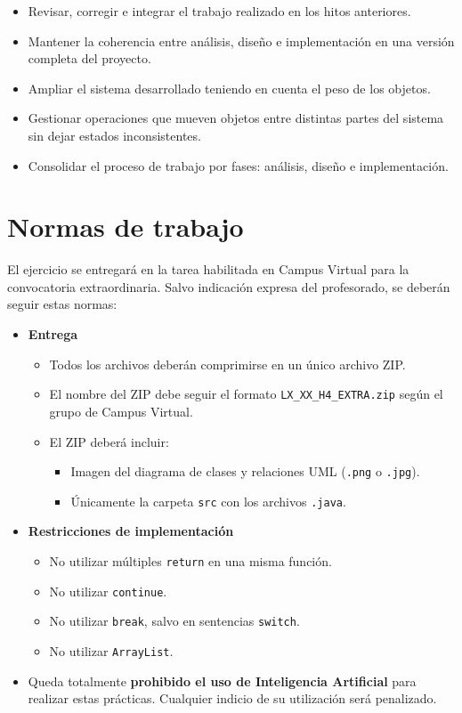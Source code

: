 \documentclass[11pt,a4paper]{article}
\begin{document}
\begin{itemize}
    \item Revisar, corregir e integrar el trabajo realizado en los hitos anteriores.
    \item Mantener la coherencia entre análisis, diseño e implementación en una versión completa del proyecto.
    \item Ampliar el sistema desarrollado teniendo en cuenta el peso de los objetos.
    \item Gestionar operaciones que mueven objetos entre distintas partes del sistema sin dejar estados inconsistentes.
    \item Consolidar el proceso de trabajo por fases: análisis, diseño e implementación.
\end{itemize}

\section{Normas de trabajo}

El ejercicio se entregará en la tarea habilitada en Campus Virtual para la convocatoria extraordinaria. Salvo indicación expresa del profesorado, se deberán seguir estas normas:

\begin{itemize}
    \item \textbf{Entrega}
    \begin{itemize}
        \item Todos los archivos deberán comprimirse en un único archivo ZIP.
        \item El nombre del ZIP debe seguir el formato \texttt{LX\_XX\_H4\_EXTRA.zip} según el grupo de Campus Virtual.
        \item El ZIP deberá incluir:
        \begin{itemize}
            \item Imagen del diagrama de clases y relaciones UML (\texttt{.png} o \texttt{.jpg}).
            \item Únicamente la carpeta \texttt{src} con los archivos \texttt{.java}.
        \end{itemize}
    \end{itemize}
    \item \textbf{Restricciones de implementación}
    \begin{itemize}
        \item No utilizar múltiples \texttt{return} en una misma función.
        \item No utilizar \texttt{continue}.
        \item No utilizar \texttt{break}, salvo en sentencias \texttt{switch}.
        \item No utilizar \texttt{ArrayList}.
    \end{itemize}
    \item Queda totalmente \textbf{prohibido el uso de Inteligencia Artificial} para realizar estas prácticas. Cualquier indicio de su utilización será penalizado.
\end{itemize}
\end{document}
